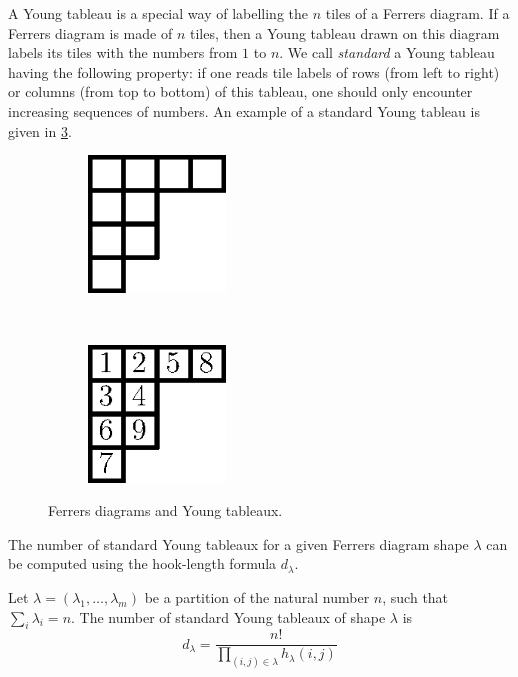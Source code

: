A Young tableau is a special way of labelling the \(n\) tiles of a Ferrers
diagram. If a Ferrers diagram is made of $n$ tiles, then a Young tableau drawn
on this diagram labels its tiles with the numbers from $1$ to $n$. We call
\emph{standard} a Young tableau having the following property:
if one reads tile labels of rows (from left to right) or
columns (from top to bottom) of this tableau, one should only encounter increasing sequences of
numbers. An example of a standard Young tableau is given in
\ref{fig:xy:lattice:young}.

\begin{figure}
\centering
\begin{subfigure}[t]{0.47\textwidth}
\centering
	\includegraphics[width=0.4\textwidth]{fig/x+y/lattice/ferrers}
	\label{fig:xy:lattice:ferrers}
\end{subfigure}
~
\begin{subfigure}[t]{0.47\textwidth}
\centering
	\includegraphics[width=0.4\textwidth]{fig/x+y/lattice/young}
	\label{fig:xy:lattice:young}
\end{subfigure}
\caption{Ferrers diagrams and Young tableaux.}
\end{figure}

The number of standard Young tableaux for a given Ferrers diagram shape
\(\lambda\) can be computed using the hook-length formula \(d_{\lambda}\).
\begin{theorem}
\label{theorem:xy:lattice:hook}
Let \(\lambda = (\lambda_1,\ldots,\lambda_m)\) be a partition of the natural
number \(n\), \ie such that \(\sum_i \lambda_i = n\). The number of standard
Young tableaux of shape \(\lambda\) is
\begin{displaymath}
d_{\lambda} = \frac{n!}{\prod_{(i,j) \in \lambda} h_{\lambda}(i,j)}
\end{displaymath}
\end{theorem}

